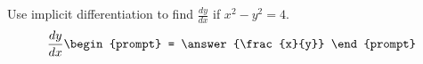 \documentclass{ximera}
\author{Gregory Hartman \and Matthew Carr}
\begin{document}
\begin{exercise}



Use implicit differentiation to find $\frac{dy}{dx}$ if $x^2-y^2=4$.
\[
\frac{dy}{dx}
\begin{prompt}
= \answer{\frac{x}{y}}
\end{prompt}
\]
\end{exercise}
\end{document}
